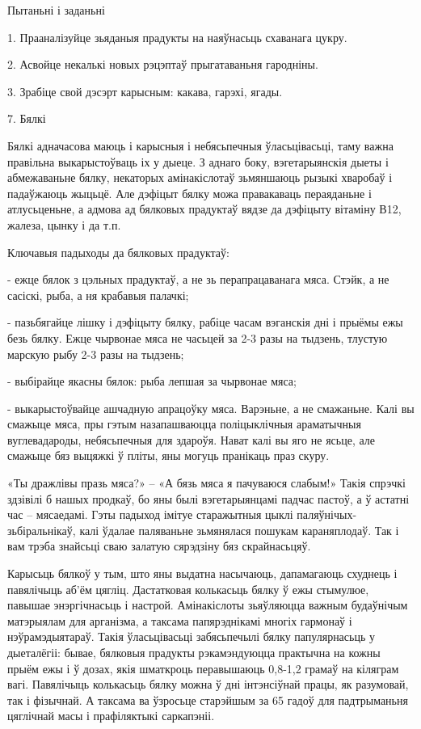 Пытаньні і заданьні

1. Прааналізуйце зьяданыя прадукты на наяўнасьць схаванага цукру.

2. Асвойце некалькі новых рэцэптаў прыгатаваньня гародніны.

3. Зрабіце свой дэсэрт карысным: какава, гарэхі, ягады.


7. Бялкі

Бялкі адначасова маюць і карысныя і небясьпечныя ўласьцівасьці, таму важна правільна выкарыстоўваць іх у дыеце. З аднаго боку, вэгетарыянскія дыеты і абмежаваньне бялку, некаторых амінакіслотаў зьмяншаюць рызыкі хваробаў і падаўжаюць жыцьцё. Але дэфіцыт бялку можа правакаваць пераяданьне і атлусьценьне, а адмова ад бялковых прадуктаў вядзе да дэфіцыту вітаміну В12, жалеза, цынку і да т.п.

Ключавыя падыходы да бялковых прадуктаў:

- ежце бялок з цэльных прадуктаў, а не зь перапрацаванага мяса. Стэйк, а не сасіскі, рыба, а ня крабавыя палачкі;

- пазьбягайце лішку і дэфіцыту бялку, рабіце часам вэганскія дні і прыёмы ежы безь бялку. Ежце чырвонае мяса не часьцей за 2-3 разы на тыдзень, тлустую марскую рыбу 2-3 разы на тыдзень;

- выбірайце якасны бялок: рыба лепшая за чырвонае мяса;

- выкарыстоўвайце ашчадную апрацоўку мяса. Варэньне, а не смажаньне. Калі вы смажыце мяса, пры гэтым назапашваюцца поліцыклічныя араматычныя вуглевадароды, небясьпечныя для здароўя. Нават калі вы яго не ясьце, але смажыце бяз выцяжкі ў пліты, яны могуць пранікаць праз скуру.

«Ты дражлівы празь мяса?» – «А бязь мяса я пачуваюся слабым!» Такія спрэчкі здзівілі б нашых продкаў, бо яны былі вэгетарыянцамі падчас пастоў, а ў астатні час – мясаедамі. Гэты падыход імітуе старажытныя цыклі паляўнічых-зьбіральнікаў, калі ўдалае паляваньне зьмянялася пошукам караняплодаў. Так і вам трэба знайсьці сваю залатую сярэдзіну бяз скрайнасьцяў.

Карысьць бялкоў у тым, што яны выдатна насычаюць, дапамагаюць схуднець і павялічыць аб'ём цягліц. Дастатковая колькасьць бялку ў ежы стымулюе, павышае энэргічнасьць і настрой. Амінакіслоты зьяўляюцца важным будаўнічым матэрыялам для арганізма, а таксама папярэднікамі многіх гармонаў і нэўрамэдыятараў. Такія ўласьцівасьці забясьпечылі бялку папулярнасьць у дыеталёгіі: бывае, бялковыя прадукты рэкамэндуюцца практычна на кожны прыём ежы і ў дозах, якія шматкроць перавышаюць 0,8-1,2 грамаў на кіляграм вагі. Павялічыць колькасьць бялку можна ў дні інтэнсіўнай працы, як разумовай, так і фізычнай. А таксама ва ўзросьце старэйшым за 65 гадоў для падтрыманьня цяглічнай масы і прафіляктыкі саркапэніі.

